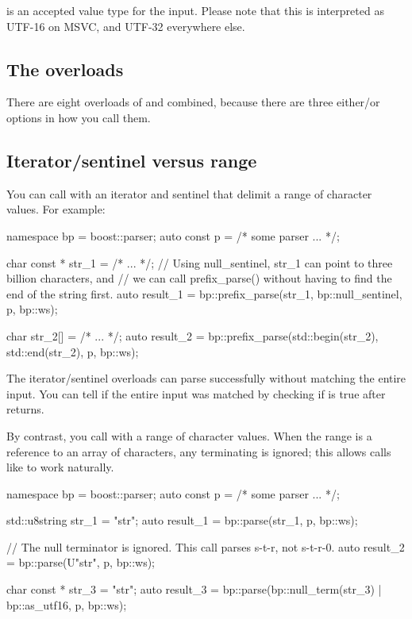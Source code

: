 \documentclass{MyBook}
\begin{document}
\begin{marker}[title=Note ]
 is an accepted value type for the input. Please note that this is interpreted as UTF-16 on MSVC, and UTF-32 everywhere else. 
\end{marker}

\subsection{The overloads}

There are eight overloads of  and  combined, because there are three either/or options in how you call them.

\subsection{Iterator/sentinel versus range}

You can call  with an iterator and sentinel that delimit a range of character values. For example:

\begin{code}
namespace bp = boost::parser;
auto const p = /* some parser ... */;

char const * str_1 = /* ... */;
// Using null_sentinel, str_1 can point to three billion characters, and
// we can call prefix_parse() without having to find the end of the string first.
auto result_1 = bp::prefix_parse(str_1, bp::null_sentinel, p, bp::ws);

char str_2[] = /* ... */;
auto result_2 = bp::prefix_parse(std::begin(str_2), std::end(str_2), p, bp::ws);
\end{code}

The iterator/sentinel overloads can parse successfully without matching the entire input. You can tell if the entire input was matched by checking if  is true after  returns.

By contrast, you call  with a range of character values. When the range is a reference to an array of characters, any terminating  is ignored; this allows calls like  to work naturally.

\begin{code}
namespace bp = boost::parser;
auto const p = /* some parser ... */;

std::u8string str_1 = "str";
auto result_1 = bp::parse(str_1, p, bp::ws);

// The null terminator is ignored.  This call parses s-t-r, not s-t-r-0.
auto result_2 = bp::parse(U"str", p, bp::ws);

char const * str_3 = "str";
auto result_3 = bp::parse(bp::null_term(str_3) | bp::as_utf16, p, bp::ws);
\end{code}
\end{document}
